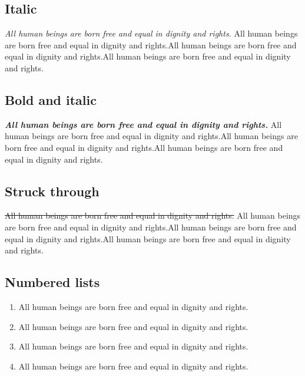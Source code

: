 \documentclass[
]{beamer}
\providecommand{\tightlist}{%
  \setlength{\itemsep}{0pt}\setlength{\parskip}{0pt}}
\begin{document}
\hypertarget{italic}{%
\subsection{Italic}\label{italic}}

\emph{All human beings are born free and equal in dignity and rights.}
All human beings are born free and equal in dignity and rights.All human
beings are born free and equal in dignity and rights.All human beings
are born free and equal in dignity and rights.

\hypertarget{bold-and-italic}{%
\subsection{Bold and italic}\label{bold-and-italic}}

\textbf{\emph{All human beings are born free and equal in dignity and
rights.}} All human beings are born free and equal in dignity and
rights.All human beings are born free and equal in dignity and
rights.All human beings are born free and equal in dignity and rights.

\hypertarget{struck-through}{%
\subsection{Struck through}\label{struck-through}}

\st{All human beings are born free and equal in dignity and rights.} All
human beings are born free and equal in dignity and rights.All human
beings are born free and equal in dignity and rights.All human beings
are born free and equal in dignity and rights.

\hypertarget{numbered-lists}{%
\subsection{Numbered lists}\label{numbered-lists}}

\begin{enumerate}
\def\labelenumi{\arabic{enumi}.}
\tightlist
\item
  All human beings are born free and equal in dignity and rights.
\item
  All human beings are born free and equal in dignity and rights.
\item
  All human beings are born free and equal in dignity and rights.
\item
  All human beings are born free and equal in dignity and rights.
\end{enumerate}
\end{document}
